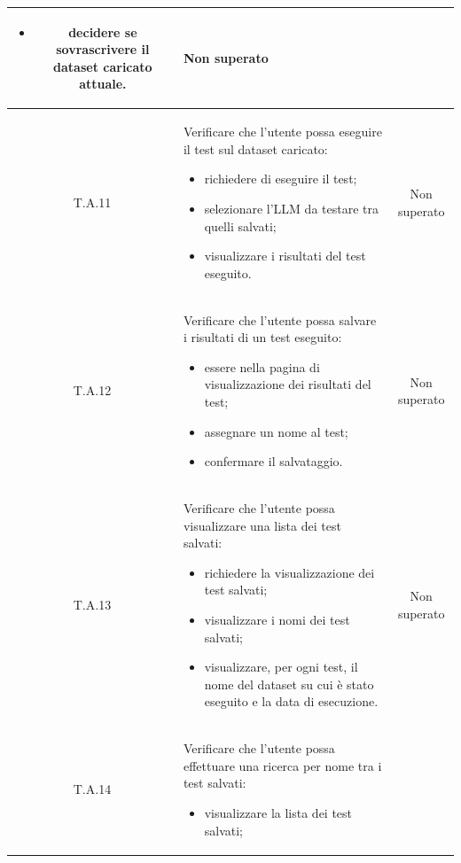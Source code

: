 \begin{tabularx}{\textwidth}{|c|X|c|}
\begin{itemize}
                            \item decidere se sovrascrivere il dataset caricato attuale.
                        \end{itemize} & Non superato\\ %
    \hline
    \label{ta:ta11}T.A.11 & Verificare che l'utente possa eseguire il test sul dataset caricato:
                        \begin{itemize}
                            \item richiedere di eseguire il test;
                            \item selezionare l'LLM da testare tra quelli salvati;
                            \item visualizzare i risultati del test eseguito.
                        \end{itemize} & Non superato\\ %
    \hline
    \label{ta:ta12}T.A.12 & Verificare che l'utente possa salvare i risultati di un test eseguito:
                        \begin{itemize}
                            \item essere nella pagina di visualizzazione dei risultati del test;
                            \item assegnare un nome al test;
                            \item confermare il salvataggio.
                        \end{itemize} & Non superato\\ %
    \hline
    \label{ta:ta13}T.A.13 & Verificare che l'utente possa visualizzare una lista dei test salvati:
                        \begin{itemize}
                            \item richiedere la visualizzazione dei test salvati;
                            \item visualizzare i nomi dei test salvati;
                            \item visualizzare, per ogni test, il nome del dataset su cui è stato eseguito e la data di esecuzione.
                        \end{itemize} & Non superato\\ %
    \hline
    \label{ta:ta14}T.A.14 & Verificare che l'utente possa effettuare una ricerca per nome tra i test salvati:
                        \begin{itemize}
                            \item visualizzare la lista dei test salvati;

\end{itemize}
\end{tabularx}
